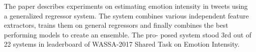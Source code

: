 The paper describes experiments on estimating emotion intensity in tweets using a generalized regressor system. The system combines various independent feature extractors, trains them on general regressors and finally combines the best performing models to create an ensemble. The pro- posed system stood 3rd out of 22 systems in leaderboard of WASSA-2017 Shared Task on Emotion Intensity.
